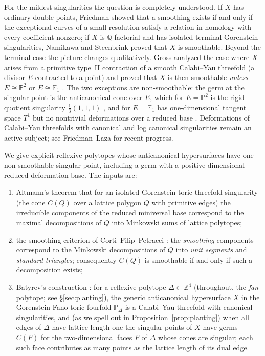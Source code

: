 \documentclass[11pt]{amsart}
\theoremstyle{definition}
\theoremstyle{remark}
\newcommand{\ZZ}{\mathbb{Z}}
\newcommand{\PP}{\mathbb{P}}
\newcommand{\FF}{\mathbb{F}}
\begin{document}
For the mildest singularities the question is completely understood.  If $X$
has ordinary double points, Friedman \cite{Friedman86} showed that a smoothing
exists if and only if the exceptional curves of a small resolution satisfy a
relation in homology with every coefficient nonzero; if $X$ is
$\mathbb{Q}$-factorial and has isolated terminal Gorenstein singularities,
Namikawa and Steenbrink \cite[Theorem~1.3]{NamikawaSteenbrink95} proved that
$X$ is smoothable.  Beyond the
terminal case the picture changes qualitatively.  Gross \cite{Gross97}
analyzed the case where $X$ arises from a primitive type~II contraction of a
smooth Calabi--Yau threefold (a divisor $E$ contracted to a point) and proved
that $X$ is then smoothable \emph{unless} $E \cong \PP^2$ or $E \cong \FF_1$
\cite[Theorem~5.8]{Gross97}.  The two exceptions are
non-smoothable: the germ at the singular point is the anticanonical cone over
$E$, which for $E=\PP^2$ is the rigid quotient singularity
$\frac13(1,1,1)$ \cite{Schlessinger71}, and for $E = \FF_1$ has
one-dimensional tangent space $T^1$ but no nontrivial deformations over a
reduced base
\cite[Example~2.19]{Gross97}.
Deformations of Calabi--Yau threefolds with canonical and log canonical
singularities remain an active subject; see Friedman--Laza
\cite{FriedmanLaza25,FriedmanLazaSigma} for recent progress.

We give explicit reflexive polytopes whose anticanonical hypersurfaces have
one non-smoothable singular point, including a germ with a positive-dimensional
reduced deformation base.  The inputs are:

\begin{enumerate}
\item Altmann's theorem \cite{Altmann97} that for an isolated Gorenstein toric
threefold singularity (the cone $C(Q)$ over a lattice polygon $Q$ with
primitive edges) the irreducible components of the reduced miniversal base
correspond to the maximal decompositions of $Q$ into Minkowski sums of lattice
polytopes;
\item the smoothing criterion of Corti--Filip--Petracci
\cite[\S5.1]{CFP}: the \emph{smoothing} components correspond to the Minkowski
decompositions of $Q$ into \emph{unit segments} and \emph{standard triangles};
consequently $C(Q)$ is smoothable if and only if such a decomposition exists;
\item Batyrev's construction \cite{Batyrev94}: for a reflexive polytope
$\Delta \subset \ZZ^4$ (throughout, the \emph{fan} polytope; see
\S\ref{sec:planting}), the generic anticanonical hypersurface $X$ in the
Gorenstein Fano toric fourfold $\PP_\Delta$ is a Calabi--Yau threefold with
canonical singularities, and (as we spell out in
Proposition~\ref{prop:planting}) when all edges of $\Delta$ have lattice
length one the singular points of $X$ have germs $C(F)$ for the
two-dimensional faces $F$ of $\Delta$ whose cones are singular; each such
face contributes as many points as the lattice length of its dual edge.
\end{enumerate}
\end{document}
